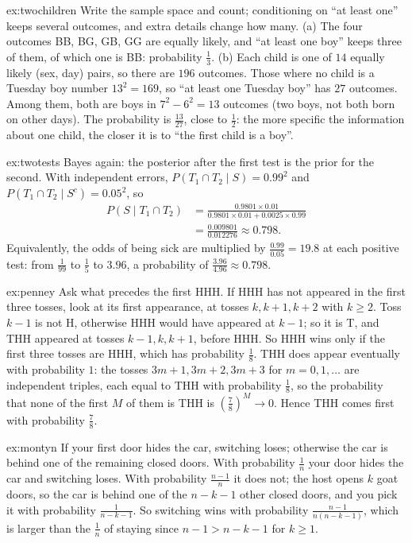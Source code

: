 \begin{solution}{ex:twochildren}
\idea Write the sample space and count; conditioning on ``at least one'' keeps several outcomes, and extra
details change how many.
\writeup (a) The four outcomes BB, BG, GB, GG are equally likely, and ``at least one boy'' keeps three of them,
of which one is BB: probability $\frac13$.
(b) Each child is one of $14$ equally likely (sex, day) pairs, so there are $196$ outcomes. Those where no child is
a Tuesday boy number $13^2=169$, so ``at least one Tuesday boy'' has $27$ outcomes. Among them, both are boys in
$7^2-6^2=13$ outcomes (two boys, not both born on other days). The probability is $\frac{13}{27}$, close to
$\frac12$: the more specific the information about one child, the closer it is to ``the first child is a boy''.
\end{solution}

\begin{solution}{ex:twotests}
\idea Bayes again: the posterior after the first test is the prior for the second.
\writeup With independent errors, $P(T_1\cap T_2\mid S)=0.99^2$ and $P(T_1\cap T_2\mid S^c)=0.05^2$, so
\[
\begin{aligned}P(S\mid T_1\cap T_2)&=\frac{0.9801\times0.01}{0.9801\times0.01+0.0025\times0.99}\\&=\frac{0.009801}{0.012276}\approx0.798.\end{aligned}
\]
Equivalently, the odds of being sick are multiplied by $\frac{0.99}{0.05}=19.8$ at each positive test: from $\frac1{99}$
to $\frac15$ to $3.96$, a probability of $\frac{3.96}{4.96}\approx0.798$.
\end{solution}

\begin{solution}{ex:penney}
\idea Ask what precedes the first HHH.
\writeup If HHH has not appeared in the first three tosses, look at its first appearance, at tosses
$k,k+1,k+2$ with $k\ge2$. Toss $k-1$ is not H, otherwise HHH would have appeared at $k-1$; so it is T, and THH
appeared at tosses $k-1,k,k+1$, before HHH. So HHH wins only if the first three tosses are HHH, which has
probability $\frac18$. THH does appear eventually with probability $1$: the tosses $3m+1,3m+2,3m+3$ for
$m=0,1,\ldots$ are independent triples, each equal to THH with probability $\frac18$, so the probability that none
of the first $M$ of them is THH is $(\frac78)^M\to0$. Hence THH comes first with probability $\frac78$.
\end{solution}

\begin{solution}{ex:montyn}
\idea If your first door hides the car, switching loses; otherwise the car is behind one of the remaining closed
doors.
\writeup With probability $\frac1n$ your door hides the car and switching loses. With probability $\frac{n-1}n$ it
does not; the host opens $k$ goat doors, so the car is behind one of the $n-k-1$ other closed doors, and you pick
it with probability $\frac1{n-k-1}$. So switching wins with probability $\frac{n-1}{n(n-k-1)}$, which is larger
than the $\frac1n$ of staying since $n-1>n-k-1$ for $k\ge1$.
\end{solution}

